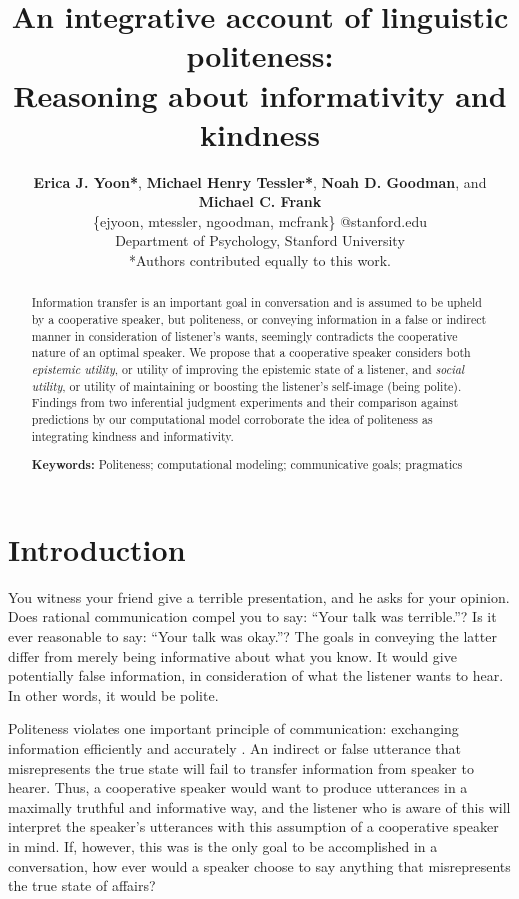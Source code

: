 \documentclass[10pt,letterpaper]{article}
\title{An integrative account of linguistic politeness: \\
Reasoning about informativity and kindness
\ndg{Politness as a balance between informativity and kindness. or something else...}}
\author{ {\large \bf Erica J. Yoon*}, {\large \bf Michael Henry Tessler*}, {\large \bf Noah D. Goodman}, and {\large \bf Michael C. Frank}   \\
\{ejyoon, mtessler, ngoodman, mcfrank\} @stanford.edu \\ 
  Department of Psychology, Stanford University \\
  *Authors contributed equally to this work.}
\begin{document}
\maketitle


\begin{abstract}

Information transfer is an important goal in conversation
and is assumed to be upheld by a cooperative speaker,
but politeness, or conveying information in a false or indirect manner in consideration of listener's wants,
seemingly contradicts the cooperative nature of an optimal speaker. 
We propose that a cooperative speaker considers both
\emph{epistemic utility}, or utility of improving the epistemic state of a listener, 
and \emph{social utility}, or utility of maintaining or boosting the listener's self-image (being polite). 
Findings from two inferential judgment experiments 
and their comparison against predictions by our computational model corroborate 
the idea of politeness as integrating kindness and informativity.

\textbf{Keywords:} 
Politeness; computational modeling; communicative goals; pragmatics

\end{abstract}


\section{Introduction}

You witness your friend give a terrible presentation, and he asks for your opinion. 
Does rational communication compel you to say: ``Your talk was terrible.''?
Is it ever reasonable to say: ``Your talk was okay.''?
The goals in conveying the latter differ from merely being informative about what you know. 
It would give potentially false information, in consideration of what the listener wants to hear.
In other words, it would be polite.

Politeness violates one important principle of communication: exchanging information efficiently and accurately \cite{Grice1975}. An indirect or false utterance that misrepresents the true state will fail to transfer information from speaker to hearer. Thus, a cooperative speaker would want to produce utterances in a maximally truthful and informative way, and the listener who is aware of this will interpret the speaker's utterances with this assumption of a cooperative speaker in mind.
If, however, this was is the only goal to be accomplished in a conversation, how ever would a speaker choose to say anything that misrepresents the true state of affairs?
\end{document}
